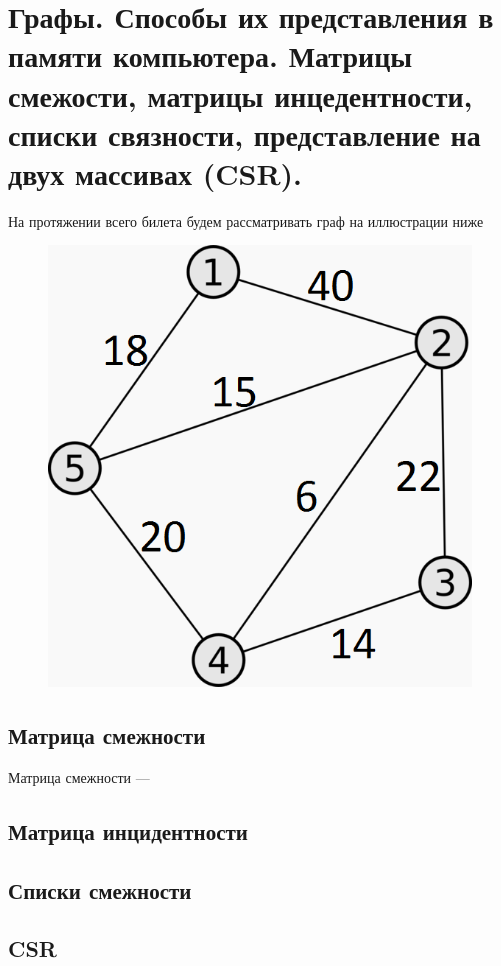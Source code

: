 \section{Графы. Способы их представления в памяти компьютера. Матрицы смежости, матрицы инцедентности, списки связности, представление на двух массивах (CSR).}

На протяжении всего билета будем рассматривать граф на иллюстрации ниже

\begin{figure}[h!]
	\centering
	\includegraphics[width=0.4\linewidth]{img_easy/5_1.png}
	\captionsetup{labelformat=empty}
	\caption{}
	\label{fig:51}
\end{figure}

\subsection{Матрица смежности}

\begin{definition}
	Матрица смежности --- 
\end{definition}

\subsection{Матрица инцидентности}

\subsection{Списки смежности}

\subsection{CSR}